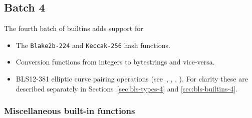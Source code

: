 \renewcommand{\note}[1]{
  \bigskip
  \refstepcounter{notenumberD}
  \noindent\textbf{Note \thenotenumberD. #1}
}

\newcommand{\itobsBE}{\mathsf{itobs_{BE}}}
\newcommand{\itobsLE}{\mathsf{itobs_{LE}}}
\newcommand{\bstoiBE}{\mathsf{bstoi_{BE}}}
\newcommand{\bstoiLE}{\mathsf{bstoi_{LE}}}

\subsection{Batch 4}
\label{sec:default-builtins-4}
The fourth batch of builtins adds support for
\begin{itemize}
\item The \texttt{Blake2b-224} and \texttt{Keccak-256} hash functions.
\item Conversion functions from integers to bytestrings and vice-versa.
\item BLS12-381 elliptic curve pairing operations
(see~\cite{CIP-0381}, \cite{BLS12-381}, \cite[4.2.1]{IETF-pairing-friendly-curves}, \cite{BLST-library}).
 For clarity these are described separately in Sections~\ref{sec:bls-types-4} and \ref{sec:bls-builtins-4}.
\end{itemize}

\subsubsection{Miscellaneous built-in functions}
\label{sec:misc-builtins-4}

